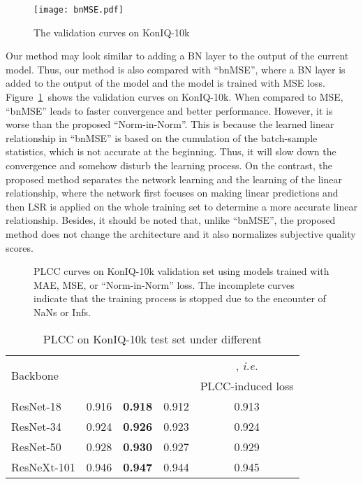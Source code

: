 \documentclass[sigconf]{acmart}
\begin{document}
\begin{figure}[!htb]
    \centering
    \texttt{[image: bnMSE.pdf]}
    \caption{The validation curves on KonIQ-10k}
    \label{fig:bnMSE}
\end{figure}

Our method may look similar to adding a BN layer to the output of the current model. 
Thus, our method is also compared with ``bnMSE'', where a BN layer is added to the output of the model and the model is trained with MSE loss. 
Figure~\ref{fig:bnMSE}~shows the validation curves on KonIQ-10k. 
When compared to MSE, ``bnMSE'' leads to faster convergence and better performance. 
However, it is worse than the proposed ``Norm-in-Norm''. 
This is because the learned linear relationship in ``bnMSE'' is based on the cumulation of the batch-sample statistics, which is not accurate at the beginning.
Thus, it will slow down the convergence and somehow disturb the learning process.
On the contrast, the proposed method separates the network learning and the learning of the linear relationship, where the network first focuses on making linear predictions and then LSR is applied on the whole training set to determine a more accurate linear relationship.
Besides, it should be noted that, unlike ``bnMSE'', the proposed method does not change the architecture and it also normalizes subjective quality scores.

\begin{figure*}[!htb]
    \centering
    \hfill
    \hfill
    \caption{PLCC curves on KonIQ-10k validation set using models trained with MAE, MSE, or ``Norm-in-Norm'' loss. The incomplete curves indicate that the training process is stopped due to the encounter of NaNs or Infs.}
    \label{fig:sensitivity}
\end{figure*}

\begin{table}[!htb]
\centering
\caption{PLCC on KonIQ-10k test set under different }
\label{tab:pq}
\begin{tabular}{lcccc}  
\toprule
\multirow{2}{*}{Backbone}  &  &  &  & , \textit{i.e.} \\ 
&  &  &  & PLCC-induced loss \\
\midrule
ResNet-18   & 0.916 & \textbf{0.918} & 0.912 & 0.913 \\
ResNet-34   & 0.924 & \textbf{0.926} & 0.923 & 0.924 \\
ResNet-50   & 0.928 & \textbf{0.930} & 0.927 & 0.929 \\
ResNeXt-101 & 0.946 & \textbf{0.947} & 0.944 & 0.945 \\
\bottomrule
\end{tabular}
\end{table}
\end{document}
